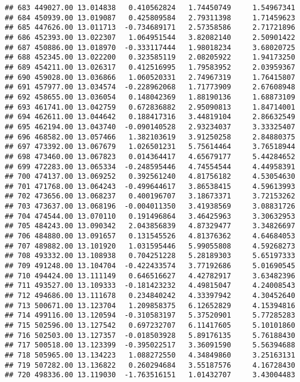 \documentclass[
]{article}
\begin{document}
\begin{verbatim}
## 683 449027.00 13.014838   0.410562824   1.74450749     1.54967341
## 684 450939.00 13.019087   0.425809584   2.79311398     1.71459623
## 685 447626.00 13.011713  -0.734689171   2.57358586     2.71721896
## 686 452393.00 13.022307   1.064951544   3.82082140     2.50901422
## 687 450886.00 13.018970  -0.333117444   1.98018234     3.68020725
## 688 452345.00 13.022200   0.323585119   2.08205922     1.94173250
## 689 454211.00 13.026317   0.412516995   1.79583952     2.03959367
## 690 459028.00 13.036866   1.060520331   2.74967319     1.76415807
## 691 457977.00 13.034574  -0.228962068   1.71773909     2.67608948
## 692 458655.00 13.036054   0.148042369   1.88190136     1.68873109
## 693 461741.00 13.042759   0.672836882   2.95090813     1.84714001
## 694 462611.00 13.044642   0.188417316   3.44819104     2.86632549
## 695 462194.00 13.043740  -0.090140528   2.93234037     3.33325407
## 696 468582.00 13.057466   1.382103619   3.91250258     2.84880375
## 697 473392.00 13.067679   1.026501231   5.75614464     3.76518944
## 698 473460.00 13.067823   0.014364417   4.65679177     5.44284652
## 699 472283.00 13.065334  -0.248595446   4.74554544     4.44958391
## 700 474137.00 13.069252   0.392561240   4.81756182     4.53054630
## 701 471768.00 13.064243  -0.499644617   3.86538415     4.59613993
## 702 473656.00 13.068237   0.400196707   3.18673371     3.72153262
## 703 473637.00 13.068196  -0.004011350   3.41938569     3.08831726
## 704 474544.00 13.070110   0.191496864   3.46425963     3.30632953
## 705 484243.00 13.090342   2.043856839   4.87329477     3.34826697
## 706 484880.00 13.091657   0.131545526   4.81376362     4.64684053
## 707 489882.00 13.101920   1.031595446   5.99055808     4.59268273
## 708 493332.00 13.108938   0.704251228   5.28189303     5.65197333
## 709 491248.00 13.104704  -0.422433574   3.77192686     5.01690545
## 710 494424.00 13.111149   0.646516627   4.42782917     3.63482396
## 711 493527.00 13.109333  -0.181423232   4.49815047     4.24008543
## 712 494686.00 13.111678   0.234840242   4.33397942     4.30452640
## 713 500671.00 13.123704   1.209858375   6.12652829     4.15394816
## 714 499116.00 13.120594  -0.310583197   5.37520901     5.77285283
## 715 502596.00 13.127542   0.697232707   6.11417605     5.10101860
## 716 502503.00 13.127357  -0.018503928   5.89176135     5.76188430
## 717 500518.00 13.123399  -0.395022517   3.36091590     5.56394688
## 718 505965.00 13.134223   1.088272550   4.34849860     3.25163131
## 719 507282.00 13.136822   0.260294684   3.55187576     4.16728430
## 720 498336.00 13.119030  -1.763516151   1.01432707     3.43004483

\end{verbatim}
\end{document}
